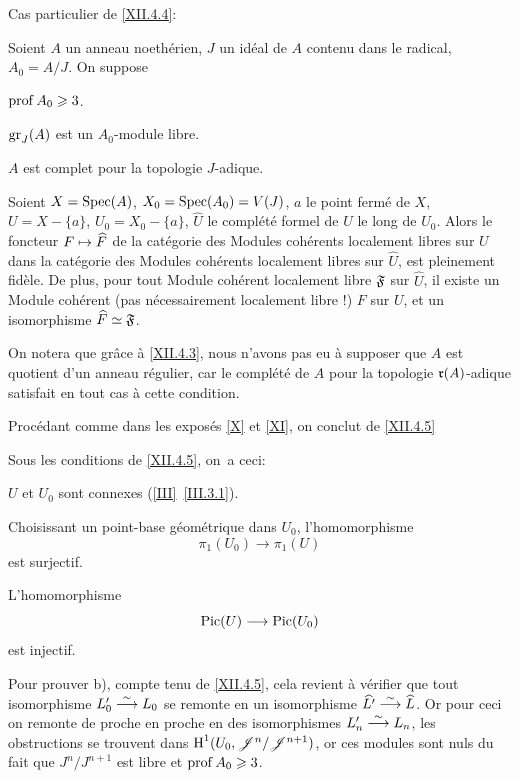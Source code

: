 \pagebreak[2]
Cas particulier de \ref{XII.4.4}:

\begin{corollaire} \label{XII.4.5}
Soient $A$ un anneau noeth\'erien, $J$ un id\'eal de $A$ contenu dans le radical, $A_0=A/J$. On suppose
\begin{enumeratei}
\item
$\operatorname{prof} A_0\geqslant 3$.
\item
$\operatorname{gr}_J(A)$ est un $A_0$-module libre.
\item
$A$ est complet pour la topologie $J$-adique.
\end{enumeratei}

Soient $X=\operatorname{Spec}(A)$, $X_0=\operatorname{Spec}(A_0)=V(J)$, $a$ le point ferm\'e de $X$, $U=X-\{a\}$, $U_0=X_0-\{a\}$, $\widehat{U}$ le compl\'et\'e formel de $U$ le long de $U_0$. Alors le foncteur $F\mto \widehat{F}$ de la cat\'egorie des Modules coh\'erents localement libres sur $U$ dans la cat\'egorie des Modules coh\'erents localement libres sur $\widehat{U}$, est pleinement fid\`ele. De plus, pour tout Module coh\'erent localement libre $\mathfrak{F}$ sur $\widehat{U}$, il existe un Module coh\'erent (pas n\'ecessairement localement libre !) $F$ sur $U$, et un isomorphisme $\widehat{F}\simeq\mathfrak{F}$.
\end{corollaire}

On notera que gr\^ace \`a \ref{XII.4.3}, nous n'avons pas eu \`a supposer que $A$ est quotient d'un anneau r\'egulier, car le compl\'et\'e de $A$ pour la topologie $\mathfrak{r}(A)$-adique satisfait en tout cas \`a cette condition.

Proc\'edant comme dans les expos\'es \ref{X} et \ref{XI}, on conclut de \ref{XII.4.5}

\begin{corollaire} \label{XII.4.6}
Sous les conditions de \ref{XII.4.5}, on~a ceci:
\begin{enumeratea}
\item
$U$ et $U_0$ sont connexes (\ref{III}~\ref{III.3.1}).

Choisissant un point-base g\'eom\'etrique dans $U_0$, l'homomorphisme
\[
\pi_1(U_0)\to \pi_1(U)
\]
est surjectif.
\item
L'homomorphisme
\[
\Pic(U)\to \Pic(U_0)
\]
est injectif.
\end{enumeratea}
\end{corollaire}

Pour prouver b), compte tenu de \ref{XII.4.5}, cela revient \`a v\'erifier que tout isomorphisme $L_0'\overset{\sim}{\longrightarrow} L_0$ se remonte en un isomorphisme $\widehat{L'}\overset{\sim}{\longrightarrow} \widehat{L}$. Or pour ceci on remonte de proche en proche en des isomorphismes $L_n'\overset{\sim}{\longrightarrow} L_n$, les obstructions se trouvent dans $\operatorname{H}^1(U_0, {\mathscr J}^n/{\mathscr J}^{n+1})$, or ces modules sont nuls du fait que $J^n/J^{n+1}$ est libre et $\operatorname{prof} A_0\geqslant 3$.

